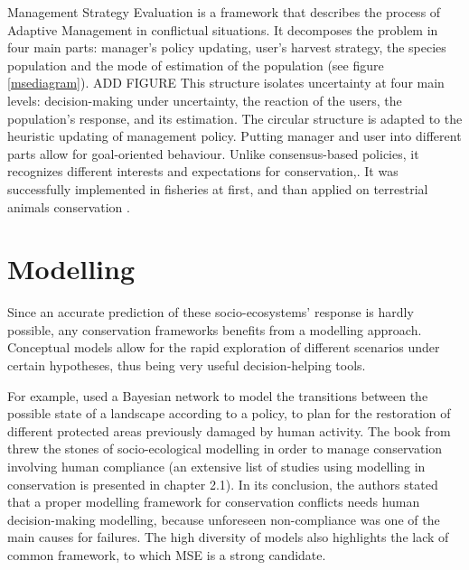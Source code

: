\documentclass[12pt,a4paper]{article}
\begin{document}
Management Strategy Evaluation is a framework that describes the process of Adaptive Management in conflictual situations.
It decomposes the problem in four main parts: manager's policy updating, user's harvest strategy, the species population and the mode of estimation of the population (see figure \ref{msediagram}). ADD FIGURE
This structure isolates uncertainty at four main levels: decision-making under uncertainty, the reaction of the users, the population's response,
and its estimation.
The circular structure is adapted to the heuristic updating of management policy.
Putting manager and user into different parts allow for goal-oriented behaviour.
Unlike consensus-based policies, it recognizes different interests and expectations for conservation,.
It was successfully implemented in fisheries at first, and than applied on terrestrial animals conservation \citep{BUNNEFELD2011441, bunnefeld2013incentivizing}.

\section{Modelling}

Since an accurate prediction of these socio-ecosystems' response is hardly possible, any conservation frameworks benefits from a modelling approach.
Conceptual models allow for the rapid exploration of different scenarios under certain hypotheses, thus being very useful decision-helping tools.
%

For example, \cite{rumpff2011state} used a Bayesian network to model the transitions between the possible state of a landscape according to a policy, to plan for the restoration of different protected areas previously damaged by human activity.
The book from \cite{schluter2012new} threw the stones of socio-ecological modelling in order to manage conservation involving human compliance (an extensive list of studies using modelling in conservation is presented in chapter 2.1).
In its conclusion, the authors stated that a proper modelling framework for conservation conflicts needs human decision-making modelling, because unforeseen non-compliance was one of the main causes for failures.
The high diversity of models also highlights the lack of common framework, to which MSE is a strong candidate.
\end{document}
